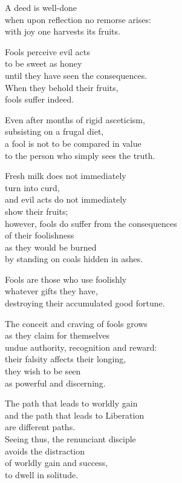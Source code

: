 A deed is well-done\\
when upon reflection no remorse arises:\\
with joy one harvests its fruits.


Fools perceive evil acts\\
to be sweet as honey\\
until they have seen the consequences.\\
When they behold their fruits,\\
fools suffer indeed.


Even after months of rigid asceticism,\\
subsisting on a frugal diet,\\
a fool is not to be compared in value\\
to the person who simply sees the truth.


Fresh milk does not immediately\\
turn into curd,\\
and evil acts do not immediately\\
show their fruits;\\
however, fools do suffer from the consequences\\
of their foolishness\\
as they would be burned\\
by standing on coals hidden in ashes.


Fools are those who use foolishly\\
whatever gifts they have,\\
destroying their accumulated good fortune.


The conceit and craving of fools grows\\
as they claim for themselves\\
undue authority, recognition and reward:\\
their falsity affects their longing,\\
they wish to be seen\\
as powerful and discerning.



The path that leads to worldly gain\\
and the path that leads to Liberation\\
are different paths.\\
Seeing thus, the renunciant disciple\\
avoids the distraction\\
of worldly gain and success,\\
to dwell in solitude.
